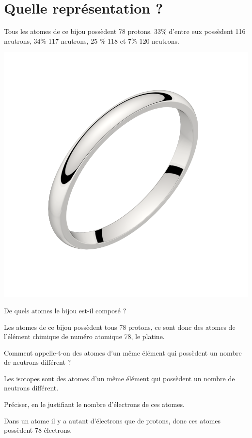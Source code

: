 \section{Quelle représentation ?}

\begin{multicols}{2}
	Tous les atomes de ce bijou possèdent 78 protons. 33\% d'entre eux possèdent 116 neutrons, 34\% 117 neutrons, 25 \% 118 et 7\% 120 neutrons.

	
	\begin{center}
		\includegraphics[scale=0.12]{img/ring2}
	\end{center}
\end{multicols}


\begin{questions}
	\question[1] De quels atomes le bijou est-il composé ?
	\fillwithdottedlines{2cm}
	\begin{solution}
		Les atomes de ce bijou possèdent tous 78 protons, ce sont donc des atomes de l'élément chimique de numéro atomique 78, le platine.
	\end{solution}
	
	\question[1] Comment appelle-t-on des atomes d'un même élément qui possèdent un nombre de neutrons différent ?
	\fillwithdottedlines{2cm}
	\begin{solution}
		Les isotopes sont des atomes d'un même élément qui possèdent un nombre de neutrons différent.
	\end{solution}
	
	\question[1] Préciser, en le justifiant le nombre d'électrons de ces atomes.
	\fillwithdottedlines{3cm}
	\begin{solution}
		Dans un atome il y a autant d'électrons que de protons, donc ces atomes possèdent 78 électrons. 
	\end{solution}
\end{questions}
